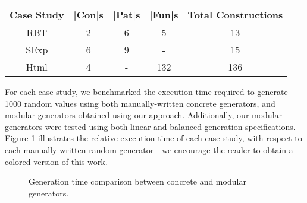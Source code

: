 \begin{table}[H]
  \begin{tabular}{||c||c||c||c||c||}
    \hline
    Case Study & |Con|s & |Pat|s & |Fun|s & Total Constructions \\ \hline
    \hline
    RBT        & 2      & 6      & 5      & 13                  \\ \hline
    SExp       & 6      & 9      & -      & 15                  \\ \hline
    Html       & 4      & -      & 132    & 136                 \\ \hline
  \end{tabular}
\end{table}

For each case study, we benchmarked the execution time required to generate 1000
random values using both manually-written concrete generators, and modular
generators obtained using our approach.
%
Additionally, our modular generators were tested using both linear and balanced
generation specifications.
%
Figure \ref{fig:times} illustrates the relative execution time of each case
study, with respect to each manually-written random generator---we encourage the
reader to obtain a colored version of this work.

\begin{figure}[b]
  \centering
  \caption{Generation time comparison between concrete and modular generators.}
  \label{fig:times}
\end{figure}
